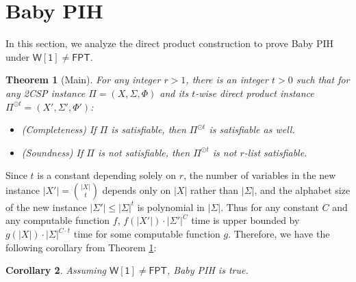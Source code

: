 \documentclass[10pt,a4paper]{article}
\newtheorem{theorem}{Theorem}
\newtheorem{corollary}[theorem]{Corollary}
\newcommand{\wone}{\mathsf{W[1]}}
\newcommand{\fpt}{\mathsf{FPT}}
\begin{document}
\section{Baby PIH}
\label{sec:baby}
\noindent In this section, we analyze the direct product construction to prove Baby PIH under $\wone \neq \fpt$.

\begin{theorem}[Main]\label{thm:baby}
    For any integer $r>1$, there is an integer $t>0$ such that for any 2CSP instance $\Pi=(X,\Sigma,\Phi)$ and its $t$-wise direct product instance $\Pi^{\odot t}=(X',\Sigma',\Phi')$:
    \begin{itemize}
        \item (Completeness) If $\Pi$ is satisfiable, then $\Pi^{\odot t}$ is satisfiable as well.
        \item (Soundness) If $\Pi$ is not satisfiable, then $\Pi^{\odot t}$ is not $r$-list satisfiable.
    \end{itemize}
\end{theorem}


Since $t$ is a constant depending solely on $r$, the number of variables in the new instance $|X'|=\binom{|X|}{t}$ depends only on $|X|$ rather than $|\Sigma|$, and the alphabet size of the new instance $|\Sigma'|\le |\Sigma|^t$ is polynomial in $|\Sigma|$. Thus for any constant $C$ and any computable function $f$, $f(|X'|)\cdot |\Sigma'|^{C}$ time is upper bounded by $g(|X|)\cdot |\Sigma|^{C\cdot t}$ time for some computable function $g$. Therefore, we have the following corollary from Theorem \ref{thm:baby}:
\begin{corollary}
    Assuming $\wone\neq\fpt$, Baby PIH is true.
\end{corollary}
\end{document}
